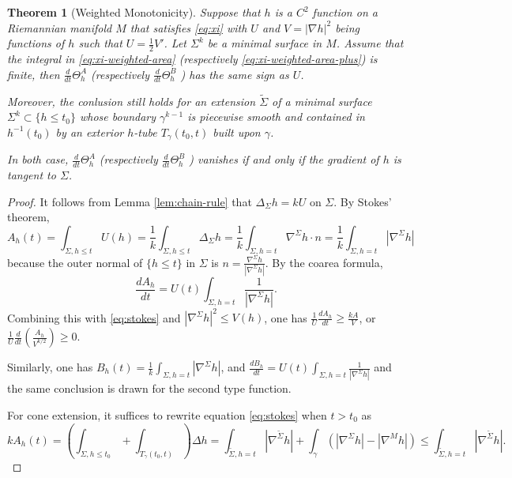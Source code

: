 \documentclass[11pt]{article}
\newtheorem{theorem}{Theorem}
\begin{document}
\begin{theorem}[Weighted Monotonicity]
\label{thm:monotonicity-warped}
Suppose that \(h\) is a \(C^2\) function on a Riemannian manifold \(M\) that
satisfies \eqref{eq:xi} with \(U\) and \(V= |\nabla h|^2\) being functions of \(h\)
such that \(U = \frac{1}{2}V'\). Let \(\Sigma^k\) be a minimal
surface in \(M\).
Assume that the integral in \eqref{eq:xi-weighted-area} (respectively
\eqref{eq:xi-weighted-area-plus})  is finite, then \(\frac{d}{dt}\Theta^A_h\)
(respectively \(\frac{d}{dt}\Theta^B_h\) ) has the same sign as \(U\).

Moreover, the conlusion still holds for an extension  \(\tilde\Sigma\)  of a minimal
surface \(\Sigma^k\subset\{h \leq t_0\}\) whose boundary \(\gamma^{k-1}\) is piecewise
smooth and contained in \(h^{-1}(t_0)\) by an 
exterior \(h\)-tube \(T_{\gamma}(t_0, t)\) built upon \(\gamma\). 

In both case,  \(\frac{d}{dt}\Theta^A_h\) (respectively \(\frac{d}{dt}\Theta^B_h\) )
vanishes if and only if the gradient of \(h\) is tangent to \(\Sigma\).
\end{theorem}
\begin{proof}
It follows from Lemma \ref{lem:chain-rule} that \(\Delta_\Sigma h = kU\) on \(\Sigma\). By
Stokes' theorem,
\begin{equation}
\label{eq:stokes}
A_h(t) = \int_{\Sigma,h\leq t} U(h) = \frac{1}{k}\int_{\Sigma,h\leq t}\Delta_\Sigma h = \frac{1}{k}\int_{\Sigma,h=t}\nabla^\Sigma h\cdot n = \frac{1}{k}\int_{\Sigma,h=t}|\nabla^\Sigma h|
\end{equation}
because the outer normal of \(\{h\leq t\}\) in \(\Sigma\) is \(n=
\frac{\nabla^{\Sigma} h}{|\nabla^{\Sigma} h|}\). By the coarea formula, 
\[
 \frac{dA_h}{dt} = U(t)\int_{\Sigma,h = t} \frac{1}{|\nabla^\Sigma h|}.
\]
Combining this with \eqref{eq:stokes} and \(|\nabla^\Sigma h|^2\leq  V(h)\), one has \(\frac{1}{U}\frac{dA_h}{dt} \geq \frac{k A}{V}\), or
\(\frac{1}{U} \frac{d}{dt}(\frac{A_h}{V^{k/2}})\geq 0\).

Similarly, one has \(B_h(t) = \frac{1}{k}\int_{\Sigma,h = t}|\nabla^\Sigma h|\), and
\(\frac{dB_h}{dt} = U(t)\int_{\Sigma,h = t} \frac{1}{|\nabla^\Sigma h|}\) and the
same conclusion is drawn for the second type function.

For cone extension, it suffices to rewrite equation \eqref{eq:stokes} when \(t > t_0\) as
   \[
    kA_h(t) = \left(\int_{\Sigma,h\leq t_0}+
   \int_{T_{\gamma}(t_0,t)}\right)\Delta h =
   \int_{\tilde\Sigma,h=t}|\nabla^{\tilde\Sigma} h| +
   \int_{\gamma}\left( |\nabla^\Sigma h| - |\nabla^M h|  \right)\leq
   \int_{\tilde\Sigma,h=t}|\nabla^{\tilde\Sigma} h|.
   \]
\end{proof}
\end{document}
